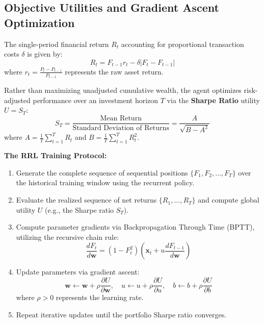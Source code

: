 \subsection{Objective Utilities and Gradient Ascent Optimization}
The single-period financial return $R_t$ accounting for proportional transaction costs $\delta$ is given by:
\begin{equation}
    R_t = F_{t-1} r_t - \delta |F_t - F_{t-1}|
\end{equation}
where $r_t = \frac{P_t - P_{t-1}}{P_{t-1}}$ represents the raw asset return.

Rather than maximizing unadjusted cumulative wealth, the agent optimizes risk-adjusted performance over an investment horizon $T$ via the \textbf{Sharpe Ratio} utility $U = S_T$:
\begin{equation}
    S_T = \frac{\text{Mean Return}}{\text{Standard Deviation of Returns}} = \frac{A}{\sqrt{B - A^2}}
\end{equation}
where $A = \frac{1}{T}\sum_{t=1}^T R_t$ and $B = \frac{1}{T}\sum_{t=1}^T R_t^2$.

\textbf{The RRL Training Protocol:}
\begin{enumerate}
    \item Generate the complete sequence of sequential positions $\{F_1, F_2, \dots, F_T\}$ over the historical training window using the recurrent policy.
    \item Evaluate the realized sequence of net returns $\{R_1, \dots, R_T\}$ and compute global utility $U$ (e.g., the Sharpe ratio $S_T$).
    \item Compute parameter gradients via Backpropagation Through Time (BPTT), utilizing the recursive chain rule:
    \begin{equation}
        \frac{d F_t}{d \mathbf{w}} = (1 - F_t^2)\left( \mathbf{x}_t + u \frac{d F_{t-1}}{d \mathbf{w}} \right)
    \end{equation}
    \item Update parameters via gradient ascent:
    \begin{equation}
        \mathbf{w} \leftarrow \mathbf{w} + \rho \frac{\partial U}{\partial \mathbf{w}}, \quad u \leftarrow u + \rho \frac{\partial U}{\partial u}, \quad b \leftarrow b + \rho \frac{\partial U}{\partial b}
    \end{equation}
    where $\rho > 0$ represents the learning rate.
    \item Repeat iterative updates until the portfolio Sharpe ratio converges.
\end{enumerate}

